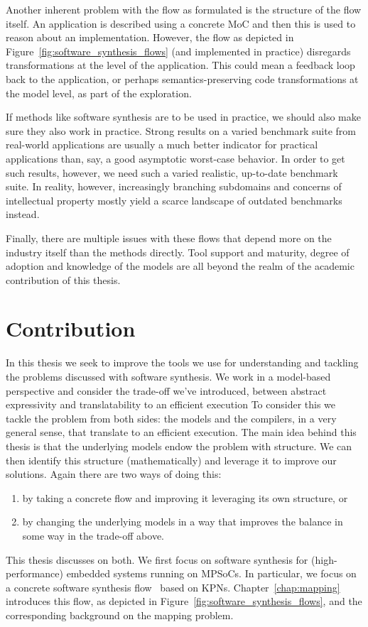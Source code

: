 Another inherent problem with the flow as formulated is the structure of the flow itself.
An application is described using a concrete \ac{MoC} and then this is used to reason about an implementation.
However, the flow as depicted in Figure~\ref{fig:software_synthesis_flows} (and implemented in practice) disregards transformations at the level of the application.
This could mean a feedback loop back to the application, or perhaps semantics-preserving code transformations at the model level, as part of the exploration.

If methods like software synthesis are to be used in practice, we should also make sure they also work in practice. 
Strong results on a varied benchmark suite from real-world applications are usually a much better indicator for practical applications than, say, a good asymptotic worst-case behavior.
In order to get such results, however, we need such a varied realistic, up-to-date benchmark suite.
In reality, however, increasingly branching subdomains and concerns of intellectual property mostly yield a scarce landscape of outdated benchmarks instead.

Finally, there are multiple issues with these flows that depend more on the industry itself than the methods directly.
Tool support and maturity, degree of adoption and knowledge of the models are all beyond the realm of the academic contribution of this thesis.

\section{Contribution}

In this thesis we seek to improve the tools we use for understanding and tackling the problems discussed with software synthesis. 
We work in a model-based perspective and consider the trade-off we've introduced, between abstract expressivity and translatability to an efficient execution
To consider this we tackle the problem from both sides: the models and the compilers, in a very general sense, that translate to an efficient execution.
The main idea behind this thesis is that the underlying models endow the problem with structure.
We can then identify this structure (mathematically) and leverage it to improve our solutions.
Again there are two ways of doing this: 
\begin{enumerate}
\item by taking a concrete flow and improving it leveraging its own structure, or
\item by changing the underlying models in a way that improves the balance in some way in the trade-off above.
\end{enumerate}
This thesis discusses on both.
We first focus on software synthesis for (high-performance) embedded systems running on \acp{MPSoC}.
In particular, we focus on a concrete software synthesis flow~\cite{maps,castrillon2014thesis} based on \acp{KPN}. 
Chapter~\ref{chap:mapping} introduces this flow, as depicted in Figure~\ref{fig:software_synthesis_flows}, and the corresponding background on the mapping problem.

